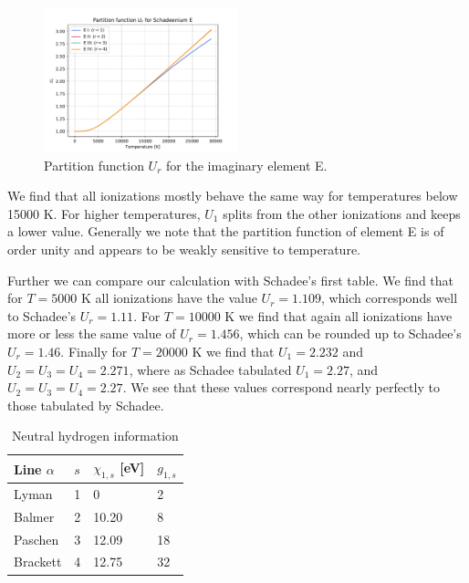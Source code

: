 \documentclass[a4paper,11.5pt,]{article}
\begin{document}
\begin{multicols}{2}
\begin{figure}[H]
	\centering
	\includegraphics[width=0.5\textwidth]{figures/part_E.pdf}
	\caption{Partition function $U_r$ for the imaginary element E.}
	\label{fig:1}
\end{figure}

\noindent We find that all ionizations mostly behave the same way for temperatures below 15000 K. For higher temperatures, $U_1$ splits from the other ionizations and keeps a lower value. Generally we note that the partition function of element E is of order unity and appears to be weakly sensitive to temperature. 

Further we can compare our calculation with Schadee's first table. We find that for $T=5000$ K all ionizations have the value $U_r = 1.109$, which corresponds well to Schadee's $U_r = 1.11$. For $T = 10000$ K we find that again all ionizations have more or less the same value of $U_r = 1.456$, which can be rounded up to Schadee's $U_r = 1.46$. Finally for $T = 20000$ K we find that $U_1 = 2.232$ and $U_2 = U_3 = U_4 = 2.271$, where as Schadee tabulated $U_1 = 2.27$, and $U_2 = U_3 = U_4 = 2.27$. We see that these values correspond nearly perfectly to those tabulated by Schadee.


\begin{table}[H]
\begin{center}
\begin{tabular}{llll}
\hline
Line $\alpha$ & $s$ & $\chi_{1,s} $ {[}eV{]} & $g_{1,s}$ \\ \hline
Lyman         & 1   & 0                      & 2          \\
Balmer        & 2   & 10.20                  & 8          \\
Paschen       & 3   & 12.09                  & 18         \\
Brackett      & 4   & 12.75                  & 32         \\ \hline

\end{tabular}
\caption{Neutral hydrogen information}
\label{tab:1}
\end{center}
\end{table}



\end{multicols}
\end{document}
